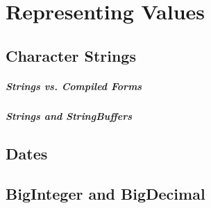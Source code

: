 \chapter{Representing Values}
\section{Character Strings}
\paragraph{Strings vs. Compiled Forms}
\paragraph{Strings and StringBuffers}
\section{Dates}
\section{BigInteger and BigDecimal}